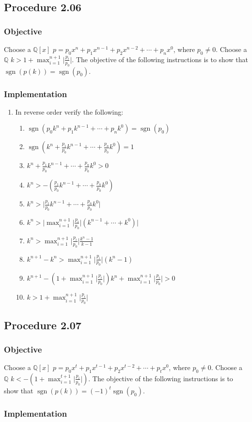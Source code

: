 \documentclass[twocolumn]{article}
\DeclareMathOperator{\sgn}{sgn}
\newcommand{\procedure}[2][]{\subsection*{Procedure #2 \ifthenelse{\equal{#1}{}}{}{(#1)}}\label{sec:procedure #2}}
\newcommand{\objective}{\subsubsection*{Objective}}
\newcommand{\implementation}{\subsubsection*{Implementation}}
\begin{document}
		\procedure{2.06}
			\objective
				Choose a $\mathbb{Q}[x]$ $p=p_0x^n+p_1x^{n-1}+p_2x^{n-2}+\cdots+p_nx^0$, where $p_0\ne 0$. Choose a $\mathbb{Q}$ $k>1+\max_{i=1}^{n+1}\lvert\frac{p_i}{p_0}\rvert$. The objective of the following instructions is to show that $\sgn(p(k))=\sgn(p_0)$.
			\implementation
				\begin{enumerate}
					\item In reverse order verify the following:
					\begin{enumerate}
						\item \textbf{$\sgn(p_0k^n+p_1k^{n-1}+\cdots+p_nk^0)=\sgn(p_0)$}
						\item $\sgn(k^n+\frac{p_1}{p_0}k^{n-1}+\cdots+\frac{p_n}{p_0}k^0)=1$
						\item $k^n+\frac{p_1}{p_0}k^{n-1}+\cdots+\frac{p_n}{p_0}k^0>0$
						\item $k^n>-(\frac{p_1}{p_0}k^{n-1}+\cdots+\frac{p_n}{p_0}k^0)$
						\item $k^n>\lvert \frac{p_1}{p_0}k^{n-1}+\cdots+\frac{p_n}{p_0}k^0\rvert$
						\item $k^n>\lvert\max_{i=1}^{n+1}\lvert \frac{p_i}{p_0}\rvert(k^{n-1}+\cdots+k^0)\rvert$
						\item $k^n>\max_{i=1}^{n+1}\lvert \frac{p_i}{p_0}\rvert\frac{k^n-1}{k-1}$
						\item $k^{n+1}-k^n>\max_{i=1}^{n+1}\lvert \frac{p_i}{p_0}\rvert(k^n-1)$
						\item $k^{n+1}-(1+\max_{i=1}^{n+1}\lvert \frac{p_i}{p_0}\rvert)k^n+\max_{i=1}^{n+1}\lvert \frac{p_i}{p_0}\rvert>0$
						\item $k>1+\max_{i=1}^{n+1}\lvert \frac{p_i}{p_0}\rvert$
					\end{enumerate}
				\end{enumerate}
		\procedure{2.07}
			\objective
				Choose a $\mathbb{Q}[x]$ $p=p_0x^t+p_1x^{t-1}+p_2x^{t-2}+\cdots+p_tx^0$, where $p_0\ne 0$. Choose a $\mathbb{Q}$ $k<-(1+\max_{i=1}^{t+1}\lvert\frac{p_i}{p_0}\rvert)$. The objective of the following instructions is to show that $\sgn(p(k))=(-1)^t\sgn(p_0)$.
			\implementation
\end{document}
